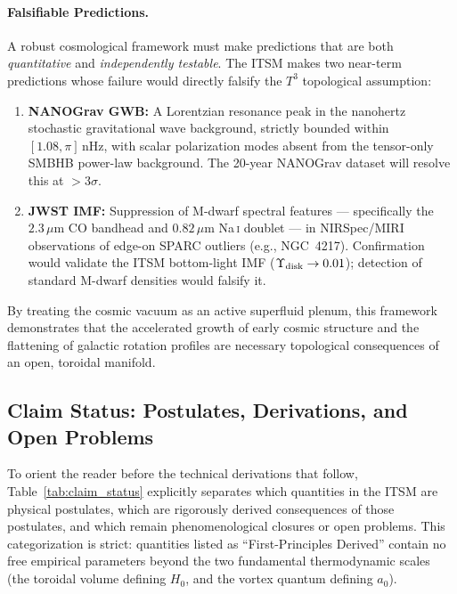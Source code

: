 \documentclass[aps,prd,10pt,twocolumn,superscriptaddress,nofootinbib,floatfix]{revtex4-2}
\begin{document}
\paragraph{Falsifiable Predictions.}
A robust cosmological framework must make predictions that are both \emph{quantitative} and \emph{independently testable}. The ITSM makes two near-term predictions whose failure would directly falsify the $T^3$ topological assumption:
\begin{enumerate}
    \item \textbf{NANOGrav GWB:} A Lorentzian resonance peak in the nanohertz stochastic gravitational wave background, strictly bounded within $[1.08, \pi]\,\text{nHz}$, with scalar polarization modes absent from the tensor-only SMBHB power-law background. The 20-year NANOGrav dataset will resolve this at $>3\sigma$.
    \item \textbf{JWST IMF:} Suppression of M-dwarf spectral features --- specifically the $2.3\,\mu\text{m}$ CO bandhead and $0.82\,\mu\text{m}$ Na\,\textsc{i} doublet --- in NIRSpec/MIRI observations of edge-on SPARC outliers (e.g., NGC~4217). Confirmation would validate the ITSM bottom-light IMF ($\Upsilon_{\rm disk}\to 0.01$); detection of standard M-dwarf densities would falsify it.
\end{enumerate}

By treating the cosmic vacuum as an active superfluid plenum, this framework demonstrates that the accelerated growth of early cosmic structure and the flattening of galactic rotation profiles are necessary topological consequences of an open, toroidal manifold.

\subsection{Claim Status: Postulates, Derivations, and Open Problems}
To orient the reader before the technical derivations that follow, Table~\ref{tab:claim_status} explicitly separates which quantities in the ITSM are physical postulates, which are rigorously derived consequences of those postulates, and which remain phenomenological closures or open problems. This categorization is strict: quantities listed as ``First-Principles Derived'' contain no free empirical parameters beyond the two fundamental thermodynamic scales (the toroidal volume defining $H_0$, and the vortex quantum defining $a_0$).
\end{document}

